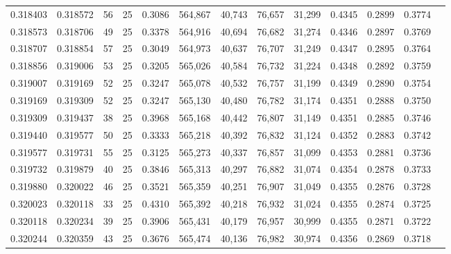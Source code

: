 \begin{tabular}{rrrrrrrrrrrrr}
0.318403 & 0.318572 &    56 &  25 &                                     0.3086 & 564,867 &  40,743 &  76,657 &  31,299 & 0.4345 & 0.2899 & 0.3774 \\
0.318573 & 0.318706 &    49 &  25 &                                     0.3378 & 564,916 &  40,694 &  76,682 &  31,274 & 0.4346 & 0.2897 & 0.3769 \\
0.318707 & 0.318854 &    57 &  25 &                                     0.3049 & 564,973 &  40,637 &  76,707 &  31,249 & 0.4347 & 0.2895 & 0.3764 \\
0.318856 & 0.319006 &    53 &  25 &                                     0.3205 & 565,026 &  40,584 &  76,732 &  31,224 & 0.4348 & 0.2892 & 0.3759 \\
0.319007 & 0.319169 &    52 &  25 &                                     0.3247 & 565,078 &  40,532 &  76,757 &  31,199 & 0.4349 & 0.2890 & 0.3754 \\
0.319169 & 0.319309 &    52 &  25 &                                     0.3247 & 565,130 &  40,480 &  76,782 &  31,174 & 0.4351 & 0.2888 & 0.3750 \\
0.319309 & 0.319437 &    38 &  25 &                                     0.3968 & 565,168 &  40,442 &  76,807 &  31,149 & 0.4351 & 0.2885 & 0.3746 \\
0.319440 & 0.319577 &    50 &  25 &                                     0.3333 & 565,218 &  40,392 &  76,832 &  31,124 & 0.4352 & 0.2883 & 0.3742 \\
0.319577 & 0.319731 &    55 &  25 &                                     0.3125 & 565,273 &  40,337 &  76,857 &  31,099 & 0.4353 & 0.2881 & 0.3736 \\
0.319732 & 0.319879 &    40 &  25 &                                     0.3846 & 565,313 &  40,297 &  76,882 &  31,074 & 0.4354 & 0.2878 & 0.3733 \\
0.319880 & 0.320022 &    46 &  25 &                                     0.3521 & 565,359 &  40,251 &  76,907 &  31,049 & 0.4355 & 0.2876 & 0.3728 \\
0.320023 & 0.320118 &    33 &  25 &                                     0.4310 & 565,392 &  40,218 &  76,932 &  31,024 & 0.4355 & 0.2874 & 0.3725 \\
0.320118 & 0.320234 &    39 &  25 &                                     0.3906 & 565,431 &  40,179 &  76,957 &  30,999 & 0.4355 & 0.2871 & 0.3722 \\
0.320244 & 0.320359 &    43 &  25 &                                     0.3676 & 565,474 &  40,136 &  76,982 &  30,974 & 0.4356 & 0.2869 & 0.3718 \\

\end{tabular}
